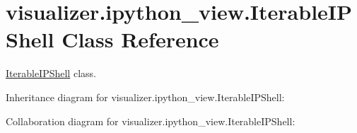 \hypertarget{classvisualizer_1_1ipython__view_1_1IterableIPShell}{}\section{visualizer.\+ipython\+\_\+view.\+Iterable\+I\+P\+Shell Class Reference}
\label{classvisualizer_1_1ipython__view_1_1IterableIPShell}


\hyperlink{classvisualizer_1_1ipython__view_1_1IterableIPShell}{Iterable\+I\+P\+Shell} class.  




Inheritance diagram for visualizer.\+ipython\+\_\+view.\+Iterable\+I\+P\+Shell\+:


Collaboration diagram for visualizer.\+ipython\+\_\+view.\+Iterable\+I\+P\+Shell\+:
